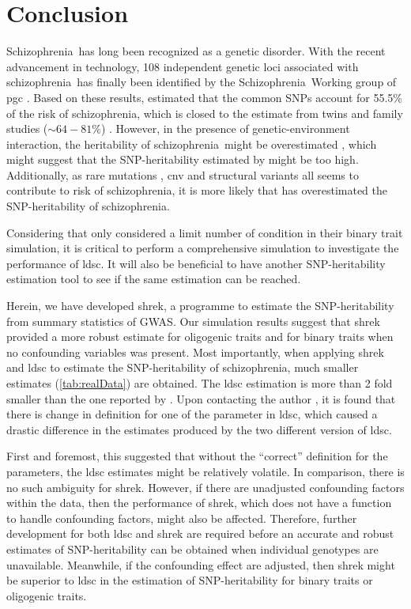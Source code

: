 \documentclass[12pt]{scrbook}
\newcommand*{\scz}{schizophrenia}
\newcommand*{\Scz}{Schizophrenia}
\begin{document}
\chapter{Conclusion}
\label{conclusionChapter}
\glsresetall
\Scz\ has long been recognized as a genetic disorder. 
With the recent advancement in technology, 108 independent genetic loci associated with \scz\ has finally been identified by the \Scz\ Working group of \gls{pgc} \citep{Ripke2014}.
Based on these results, \citet{Bulik-Sullivan2015} estimated that the common \glspl{SNP} account for 55.5\% of the risk of \scz, which is closed to the estimate from twins and family studies ($\sim64-81\%$) \citep{Sullivan2003,Lichtenstein2009}.
However, in the presence of genetic-environment interaction, the heritability of \scz\ might be overestimated \citep{zuk2012mystery}, which might suggest that the \gls{SNP}-heritability estimated by \citet{Bulik-Sullivan2015} might be too high. 
Additionally, as rare mutations \citep{purcell2014polygenic}, \gls{cnv} \citep{Szatkiewicz2014} and structural variants \citep{Walsh2008} all seems to contribute to risk of \scz,  it is more likely that \citet{Bulik-Sullivan2015} has overestimated the \gls{SNP}-heritability of \scz.

Considering that \citet{Bulik-Sullivan2015} only considered a limit number of condition in their binary trait simulation, it is critical to perform a comprehensive simulation to investigate the performance of \gls{ldsc}.
It will also be beneficial to have another \gls{SNP}-heritability estimation tool to see if the same estimation can be reached. 

Herein, we have developed \gls{shrek}, a programme to estimate the \gls{SNP}-heritability from summary statistics of \gls{GWAS}.
Our simulation results suggest that \gls{shrek} provided a more robust estimate for oligogenic traits and for binary traits when no confounding variables was present.
Most importantly, when applying \gls{shrek} and \gls{ldsc} to estimate the \gls{SNP}-heritability of \scz, much smaller estimates (\cref{tab:realData}) are obtained.
The \gls{ldsc} estimation is more than 2 fold smaller than the one reported by \citet{Bulik-Sullivan2015}.
Upon contacting the author \citep{Bulik-Sullivan2015c}, it is found that there is change in definition for one of the parameter in \gls{ldsc}, which caused a drastic difference in the estimates produced by the two different version of \gls{ldsc}.

First and foremost, this suggested that without the ``correct'' definition for the parameters, the \gls{ldsc} estimates might be relatively volatile.
In comparison, there is no such ambiguity for \gls{shrek}.
However, if there are unadjusted confounding factors within the data, then the performance of \gls{shrek}, which does not have a function to handle confounding factors, might also be affected.
Therefore, further development for both \gls{ldsc} and \gls{shrek} are required before an accurate and robust estimates of \gls{SNP}-heritability can be obtained when individual genotypes are unavailable. 
Meanwhile, if the confounding effect are adjusted, then \gls{shrek} might be superior to \gls{ldsc} in the estimation of \gls{SNP}-heritability for binary traits or oligogenic traits. 
\end{document}
